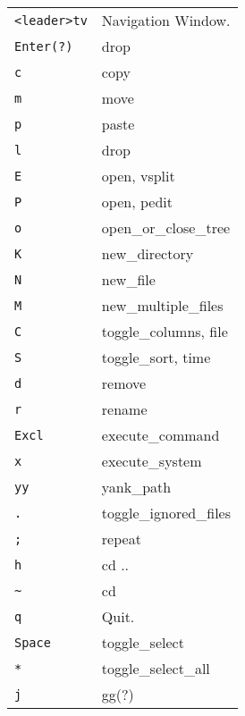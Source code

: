 \begin{multicols}{3}
	\section{}
	\begin{tabular}{@{}ll@{}}
		\verb!<leader>tv!  & Navigation Window.     \\
		\verb!Enter(?)!    & drop                   \\
		\verb!c!           & copy                   \\
		\verb!m!           & move                   \\
		\verb!p!           & paste                  \\
		\verb!l!           & drop                   \\
		\verb!E!           & open, vsplit           \\
		\verb!P!           & open, pedit            \\
		\verb!o!           & open\_or\_close\_tree  \\
		\verb!K!           & new\_directory         \\
		\verb!N!           & new\_file              \\
		\verb!M!           & new\_multiple\_files   \\
		\verb!C!           & toggle\_columns, file  \\
		\verb!S!           & toggle\_sort, time     \\
		\verb!d!           & remove                 \\
		\verb!r!           & rename                 \\
		\verb!Excl!        & execute\_command       \\
		\verb!x!           & execute\_system        \\
		\verb!yy!          & yank\_path             \\
		\verb!.!           & toggle\_ignored\_files \\
		\verb!;!           & repeat                 \\
		\verb!h!           & cd ..                  \\
		\verb!~!           & cd                     \\
		\verb!q!           & Quit.                  \\
		\verb!Space!       & toggle\_select         \\
		\verb!*!           & toggle\_select\_all    \\
		\verb!j!           & gg(?)                  \\

\end{tabular}
\end{multicols}
